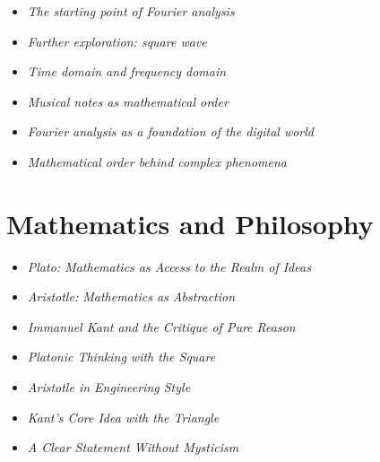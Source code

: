 \begin{NoteBox}
	\begin{itemize}
		\item \emph{The starting point of Fourier analysis}\dotfill \pageref{box:fourier-ausgangspunkt-waermeleitung}
		\item \emph{Further exploration: square wave}\dotfill \pageref{box:fourier-vertiefung-rechtecksignal}
		\item \emph{Time domain and frequency domain}\dotfill \pageref{box:fourier-zeitbereich-frequenzbereich}
		\item \emph{Musical notes as mathematical order}\dotfill \pageref{box:Musiknoten}
		\item \emph{Fourier analysis as a foundation \newline of the digital world}\dotfill \pageref{box:fourier-digitale-welt}
		\item \emph{Mathematical order behind complex phenomena}\dotfill \pageref{box:fourier-mathematische-ordnung}
	\end{itemize}
\end{NoteBox}

\section{Mathematics and Philosophy}

\begin{HistoryBox}
	
	\begin{itemize}
		\item \emph{Plato: Mathematics as Access to \newline the Realm of Ideas}\dotfill \pageref{box:plato-realm-of-ideas}
		\item \emph{Aristotle: Mathematics as Abstraction}\dotfill \pageref{box:aristotle-abstraction}
		\item \emph{Immanuel Kant and the \emph{Critique of Pure Reason}}\dotfill \pageref{box:kant-cpr}
	\end{itemize}
\end{HistoryBox}

\begin{DidacticBox}
	\begin{itemize}
		\item \emph{Platonic Thinking with the Square}\dotfill \pageref{box:plato-square}
		\item \emph{Aristotle in Engineering Style}\dotfill \pageref{box:aristotle-engineering}
		\item \emph{Kant's Core Idea with the Triangle}\dotfill \pageref{box:kant-triangle}
		\item \emph{A Clear Statement Without Mysticism}\dotfill \pageref{box:without-mysticism}
	\end{itemize}
\end{DidacticBox}

